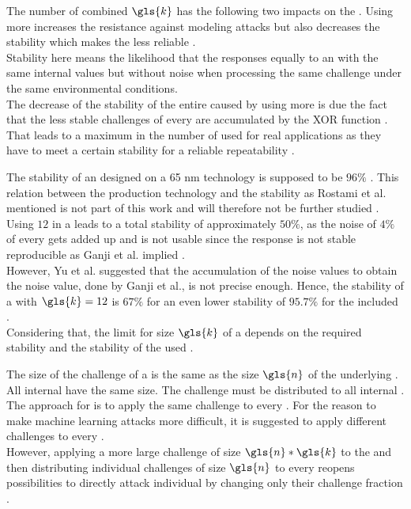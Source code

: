 The number of combined \apufs $\gls{k}$ has the following two impacts on the \puf.
Using more \apufs increases the resistance against modeling attacks but also decreases the stability which makes the \puf less reliable \cite{Becker2015ThePUFs, Ganji2015WhyPUFs}.\\
Stability here means the likelihood that the \apuf responses equally to an \apuf with the same internal values but without noise when processing the same challenge under the same environmental conditions.\\
The decrease of the stability of the entire \xpuf caused by using more \apufs is due the fact that the less stable challenges of every \apuf are accumulated by the \ac{XOR} function \cite{Rostami2014RobustMatching}.
That leads to a maximum in the number of used \apufs for real applications as they have to meet a certain stability for a reliable repeatability \cite{Rostami2014RobustMatching}.

The stability of an \apuf designed on a 65 nm technology is supposed to be $96 \%$ \cite{Rostami2014RobustMatching}.
This relation between the production technology and the stability as Rostami et al. mentioned is not part of this work and will therefore not be further studied \cite{Rostami2014RobustMatching}.\\
Using $12$ \apufs in a \xpuf leads to a total stability of approximately $50 \%$, as the noise of $4 \%$ of every \apuf gets added up and is not usable since the response is not stable reproducible as Ganji et al. implied \cite{Ganji2015WhyPUFs}.\\
However, Yu et al. suggested that the accumulation of the \apuf noise values to obtain the \xpuf noise value, done by Ganji et al., is not precise enough.
Hence, the stability of a \xpuf with $\gls{k} = 12$ is $67 \%$ for an even lower stability of $95.7 \%$ for the included \apufs \cite{Yu2016AAuthentication}.\\
Considering that, the limit for size $\gls{k}$ of a \xpuf depends on the required stability and the stability of the used \apufs.

The size of the challenge of a \xpuf is the same as the size $\gls{n}$ of the underlying \apufs.
All internal \apufs have the same size.
The challenge must be distributed to all internal \apufs.\\
The approach for \xpufs is to apply the same challenge to every \apuf.
For the reason to make machine learning attacks more difficult, it is suggested to apply different challenges to every \apuf.\\
However, applying a more large challenge of size $\gls{n} * \gls{k}$ to the \xpuf and then distributing individual challenges of size $\gls{n}$ to every \apuf reopens possibilities to directly attack individual \apufs by changing only their challenge fraction \cite{Becker2015ThePUFs}.

